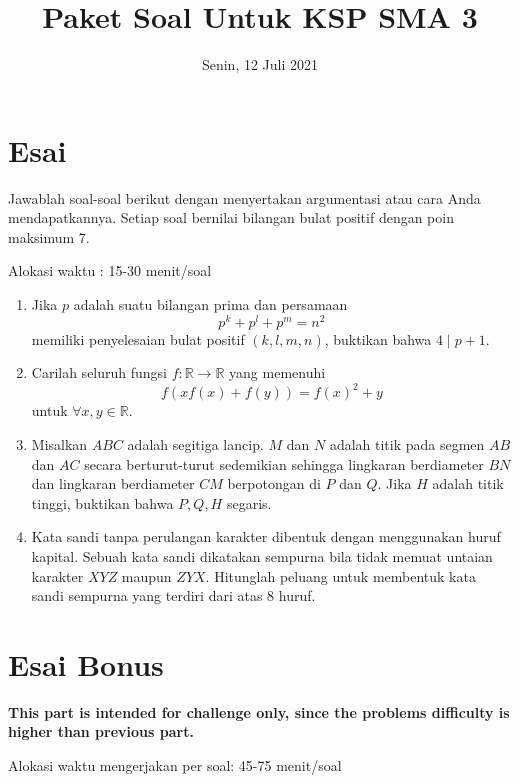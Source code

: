 \documentclass[12pt]{scrartcl}
\title{Paket Soal Untuk KSP SMA 3}
\date{Senin, 12 Juli 2021}
\begin{document}
	\maketitle

\renewcommand*\contentsname{Daftar Isi}
\tableofcontents

\newpage

\section{Esai}
Jawablah soal-soal berikut dengan menyertakan argumentasi atau cara Anda mendapatkannya. Setiap soal bernilai bilangan bulat positif dengan poin maksimum 7.

Alokasi waktu : 15-30 menit/soal

\begin{enumerate}[resume]
	\item Jika $p$ adalah suatu bilangan prima dan persamaan $$p^k+p^l+p^m=n^2$$ memiliki penyelesaian bulat positif $(k,l,m,n)$, buktikan bahwa $4\mid p+1.$
	
	\item Carilah seluruh fungsi $f:\mathbb{R}\rightarrow\mathbb{R}$ yang memenuhi $$f(xf(x)+f(y))=f(x)^2+y$$ untuk $\forall x,y\in\mathbb{R}.$
	
	\item Misalkan $ABC$ adalah segitiga lancip. $M$ dan $N$ adalah titik pada segmen $AB$ dan $AC$ secara berturut-turut sedemikian sehingga lingkaran berdiameter $BN$ dan lingkaran berdiameter $CM$ berpotongan di $P$ dan $Q$. Jika $H$ adalah titik tinggi, buktikan bahwa $P,Q,H$ segaris.
	
	\item Kata sandi tanpa perulangan karakter dibentuk dengan menggunakan huruf kapital. Sebuah kata sandi dikatakan sempurna bila tidak memuat untaian karakter $XYZ$ maupun $ZYX$. Hitunglah peluang untuk membentuk kata sandi sempurna yang terdiri dari atas 8 huruf.
\end{enumerate}
\newpage
\section{Esai Bonus}
\textbf{This part is intended for challenge only, since the problems difficulty is higher than previous part.}

Alokasi waktu mengerjakan per soal: 45-75 menit/soal
\end{document}
